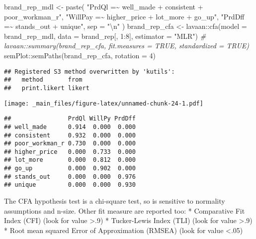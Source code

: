 \documentclass[
]{book}
\newenvironment{Shaded}{\begin{snugshade}}{\end{snugshade}}
\newcommand{\AttributeTok}[1]{\textcolor[rgb]{0.77,0.63,0.00}{#1}}
\newcommand{\CommentTok}[1]{\textcolor[rgb]{0.56,0.35,0.01}{\textit{#1}}}
\newcommand{\DecValTok}[1]{\textcolor[rgb]{0.00,0.00,0.81}{#1}}
\newcommand{\FunctionTok}[1]{\textcolor[rgb]{0.00,0.00,0.00}{#1}}
\newcommand{\NormalTok}[1]{#1}
\newcommand{\OtherTok}[1]{\textcolor[rgb]{0.56,0.35,0.01}{#1}}
\newcommand{\SpecialCharTok}[1]{\textcolor[rgb]{0.00,0.00,0.00}{#1}}
\newcommand{\StringTok}[1]{\textcolor[rgb]{0.31,0.60,0.02}{#1}}
\theoremstyle{definition}
\theoremstyle{definition}
\theoremstyle{definition}
\theoremstyle{definition}
\theoremstyle{remark}
\begin{document}
\begin{Shaded}
\begin{Highlighting}[]
\NormalTok{brand\_rep\_mdl }\OtherTok{\textless{}{-}} \FunctionTok{paste}\NormalTok{(}
  \StringTok{"PrdQl =\textasciitilde{} well\_made + consistent + poor\_workman\_r"}\NormalTok{,}
  \StringTok{"WillPay =\textasciitilde{} higher\_price + lot\_more + go\_up"}\NormalTok{,}
  \StringTok{"PrdDff =\textasciitilde{} stands\_out + unique"}\NormalTok{, }
  \AttributeTok{sep =} \StringTok{"}\SpecialCharTok{\textbackslash{}n}\StringTok{"}
\NormalTok{)}
\NormalTok{brand\_rep\_cfa }\OtherTok{\textless{}{-}}\NormalTok{ lavaan}\SpecialCharTok{::}\FunctionTok{cfa}\NormalTok{(}\AttributeTok{model =}\NormalTok{ brand\_rep\_mdl, }\AttributeTok{data =}\NormalTok{ brand\_rep[, }\DecValTok{1}\SpecialCharTok{:}\DecValTok{8}\NormalTok{], }\AttributeTok{estimator =} \StringTok{"MLR"}\NormalTok{)}
\CommentTok{\# lavaan::summary(brand\_rep\_cfa, fit.measures = TRUE, standardized = TRUE)}
\NormalTok{semPlot}\SpecialCharTok{::}\FunctionTok{semPaths}\NormalTok{(brand\_rep\_cfa, }\AttributeTok{rotation =} \DecValTok{4}\NormalTok{)}
\end{Highlighting}
\end{Shaded}

\begin{verbatim}
## Registered S3 method overwritten by 'kutils':
##   method       from  
##   print.likert likert
\end{verbatim}

\texttt{[image: \_main\_files/figure-latex/unnamed-chunk-24-1.pdf]}

\begin{Shaded}
\end{Shaded}

\begin{verbatim}
##                PrdQl WillPy PrdDff
## well_made      0.914  0.000  0.000
## consistent     0.932  0.000  0.000
## poor_workman_r 0.730  0.000  0.000
## higher_price   0.000  0.733  0.000
## lot_more       0.000  0.812  0.000
## go_up          0.000  0.902  0.000
## stands_out     0.000  0.000  0.976
## unique         0.000  0.000  0.930
\end{verbatim}

The CFA hypothesis test is a chi-square test, so is sensitive to normality assumptions and n-size. Other fit measure are reported too:
* Comparative Fit Index (CFI) (look for value \textgreater.9)
* Tucker-Lewis Index (TLI) (look for value \textgreater.9)
* Root mean squared Error of Approximation (RMSEA) (look for value \textless.05)
\end{document}
